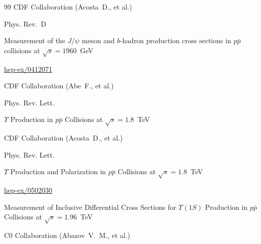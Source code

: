 \begin{thebibliography}{99}
\by  CDF Collaboration (Acosta~D., et al.)

\jour  Phys.  Rev.~D 





\paper Measurement of the $J/\psi$ meson and $b$-hadron production cross sections in $p \bar p$  collisions at $\sqrt s=1960$~GeV

\arxiv \href{http://arxiv.org/abs/hep-ex/0412071}{hep-ex/0412071}







\by  CDF Collaboration (Abe~F.,  et al.)

\jour Phys.  Rev.  Lett.





\paper $\Upsilon$ Production in $p\bar p$ Collisions at $\sqrt s =1.8$~TeV







\by CDF Collaboration (Acosta~D.,  et al.)

\jour Phys.  Rev.  Lett.





\paper $\Upsilon$ Production and Polarization in $p \bar p$ Collisions at $\sqrt s=1.8$~TeV







\arxiv \href{http://arxiv.org/abs/hep-ex/0502030}{hep-ex/0502030}

\paper Measurement of Inclusive Differential Cross Sections for $\Upsilon (1S)$ Production in $p\bar p$ Collisions at $\sqrt s =1.96$~TeV

\by   C0 Collaboration (Abazov~V.~M., et al.)


\end{thebibliography}
